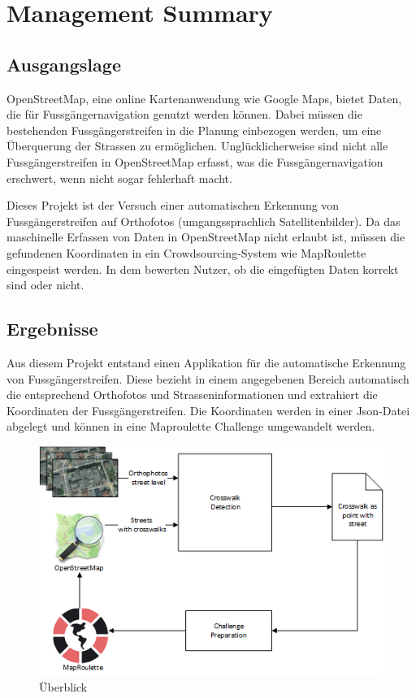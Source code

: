 \section{Management Summary}
\subsection*{Ausgangslage}
OpenStreetMap, eine online Kartenanwendung wie Google Maps, bietet Daten, die für Fussgängernavigation genutzt werden können. Dabei müssen die bestehenden Fussgängerstreifen in die Planung einbezogen werden, um eine Überquerung der Strassen zu ermöglichen. Unglücklicherweise sind nicht alle Fussgängerstreifen in OpenStreetMap erfasst, was die Fussgängernavigation erschwert, wenn nicht sogar fehlerhaft macht.

Dieses Projekt ist der Versuch einer automatischen Erkennung von Fussgängerstreifen auf Orthofotos (umgangssprachlich Satellitenbilder). Da das maschinelle Erfassen von Daten in OpenStreetMap nicht erlaubt ist, müssen die gefundenen Koordinaten in ein Crowdsourcing-System wie MapRoulette eingespeist werden. In dem bewerten Nutzer, ob die eingefügten Daten korrekt sind oder nicht.


\subsection*{Ergebnisse}
Aus diesem Projekt entstand einen Applikation für die automatische Erkennung von Fussgängerstreifen. Diese bezieht in einem angegebenen Bereich automatisch die entsprechend Orthofotos und Strasseninformationen und extrahiert die Koordinaten der Fussgängerstreifen. Die Koordinaten werden in einer Json-Datei abgelegt und können in eine Maproulette Challenge umgewandelt werden. 
\\
\begin{figure}[H]
	\centering
	\includegraphics[]{images/management_summary_1.png}
	\caption[Management Summery Überblick]{Überblick}
\end{figure}

